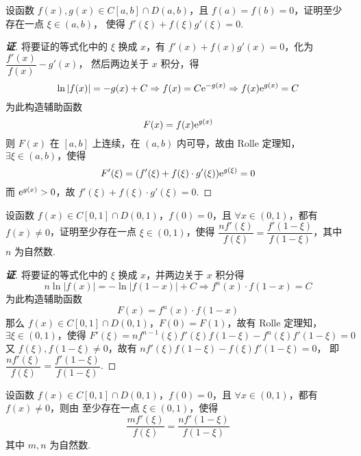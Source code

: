 \begin{example}
    设函数 $f(x),g(x)\in C[a,b]\cap D(a,b)$，且 $f(a)=f(b)=0$，证明至少存在一点 $\xi\in(a,b)$，
    使得 $f'(\xi)+f(\xi)g'(\xi)=0.$
\end{example}
\begin{proof}[{\songti \textbf{证}}]
    将要证的等式化中的 $\xi$ 换成 $x$，有 $f'(x)+f(x)g'(x)=0$，化为 $\dfrac{f'(x)}{f(x)}-g'(x)$，
    然后两边关于 $x$ 积分，得 $$\ln|f(x)|=-g(x)+C\Rightarrow f(x)=C\mathrm{e} ^{-g(x)}\Rightarrow f(x)\mathrm{e} ^{g(x)}=C$$
    为此构造辅助函数
    $$F(x)=f(x)\mathrm{e} ^{g(x)}$$
    则 $F(x)$ 在 $[a,b]$ 上连续，在 $(a,b)$ 内可导，故由 Rolle 定理知，$\exists\xi\in(a,b)\text{，使得 }$
    $$F'(\xi)=(f'(\xi)+f(\xi)\cdot g'(\xi))\mathrm{e} ^{g(\xi)}=0$$
    而 $\mathrm{e} ^{g(x)}>0$，故 $f'(\xi)+f(\xi)\cdot g'(\xi)=0.$
\end{proof}

\begin{example}
    设函数 $f(x)\in C[0,1]\cap D(0,1)$，$f(0)=0$，且 $\forall x\in(0,1)$，都有 $f(x)\neq0$，证明至少存在一点 $\xi\in(0,1)$，使得
    $\dfrac{nf'(\xi)  }{f(\xi)  }=\dfrac{f'(1-\xi)  }{f(1-\xi)  }$，其中 $n$ 为自然数.
\end{example}
\begin{proof}[{\songti \textbf{证}}]
    将要证的等式化中的 $\xi$ 换成 $x$，并两边关于 $x$ 积分得
    $$n\ln \left| f(x)  \right| =-\ln \left| f\left( 1-x\right) \right| +C\Rightarrow f^{n}(x)  \cdot f\left( 1-x\right) =C$$
    为此构造辅助函数 $$F(x)=f^{n}(x)  \cdot f\left( 1-x\right)$$
    那么 $f(x)\in C[0,1]\cap D(0,1)$，$F(0)=F(1)$，故有 Rolle 定理知，
    $$\exists\xi\in(0,1)\text{，使得 }F'(\xi)=nf^{n-1}(\xi) f'(\xi) f(1-\xi)  -f^{n}(\xi)  f'(1-\xi)  =0$$
    又 $f(\xi),f(1-\xi)\neq0$，故有 $nf'(\xi)  f(1-\xi)  -f(\xi)  f'(1-\xi)  =0$，
    即 $\dfrac{nf'(\xi)  }{f(\xi)  }=\dfrac{f'(1-\xi)  }{f(1-\xi)  }.$
\end{proof}
\begin{inference}
    设函数 $f(x)\in C[0,1]\cap D(0,1)$，$f(0)=0$，且 $\forall x\in(0,1)$，都有 $f(x)\neq0$，则由
    至少存在一点 $\xi\in(0,1)$，使得
    $$\dfrac{mf'(\xi)  }{f(\xi)  }=\dfrac{nf'(1-\xi)  }{f(1-\xi)  }$$
    其中 $m,n$ 为自然数.
\end{inference}

